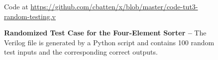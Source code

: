 
\begin{figure}[b]

  

  \centerline{\small Code at
    \url{https://github.com/cbatten/x/blob/master/code-tut3-random-testing.v}}

  \caption{\textbf{Randomized Test Case for the Four-Element Sorter --}
    The Verilog file  is generated
    by a Python script and contains 100 random test inputs and the
    corresponding correct outputs.}
  \label{code-tut3-sorter-test}

\end{figure}

